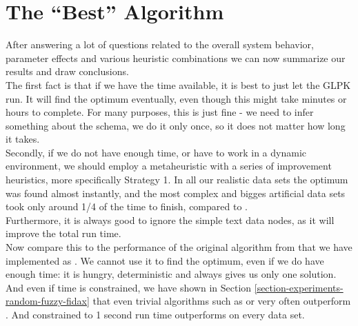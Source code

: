 \section{The ``Best'' Algorithm}

After answering a lot of questions related to the overall system behavior, parameter effects and various heuristic combinations we can now summarize our results and draw conclusions.\\

The first fact is that if we have the time available, it is best to just let the GLPK run. It will find the optimum eventually, even though this might take minutes or hours to complete. For many purposes, this is just fine - we need to infer something about the schema, we do it only once, so it does not matter how long it takes.\\

Secondly, if we do not have enough time, or have to work in a dynamic environment, we should employ a metaheuristic with a series of improvement heuristics, more specifically Strategy 1. In all our realistic data sets the optimum was found almost instantly, and the most complex and bigges artificial data sets took only around 1/4 of the time to finish, compared to .\\

Furthermore, it is always good to ignore the simple text data nodes, as it will improve the total run time.\\

Now compare this to the performance of the original algorithm from \cite{fidax} that we have implemented as . We cannot use it to find the optimum, even if we do have enough time: it is hungry, deterministic and always gives us only one solution. And even if time is constrained, we have shown in Section \ref{section-experiments-random-fuzzy-fidax} that even trivial algorithms such as  or  very often outperform . And  constrained to 1 second run time outperforms  on every data set.\\